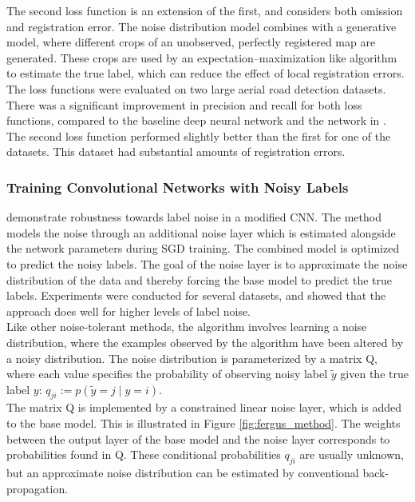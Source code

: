 The second loss function is an extension of the first, and considers both omission and registration error. The noise distribution model combines with a generative model, where different crops of an unobserved, perfectly registered map are generated. These crops are used by an expectation–maximization like algorithm to estimate the true label, which can reduce the effect of local registration errors.\\


The loss functions were evaluated on two large aerial road detection datasets. There was a significant improvement in precision and recall for both loss functions, compared to the baseline deep neural network and the network in \citep{Mnih_roads_high_res_aerial_images}. The second loss function performed slightly better than the first for one of the datasets. This dataset had substantial amounts of registration errors.\\


\subsubsection{Training Convolutional Networks with Noisy Labels}
\cite{Sukhbaatar_noisy_network_learning} demonstrate robustness towards label noise in a modified \ac{CNN}. The method models the noise through an additional noise layer which is estimated alongside the network parameters during \ac{SGD} training. The combined model is optimized to predict the noisy labels. The goal of the noise layer is to approximate the noise distribution of the data and thereby forcing the base model to predict the true labels. Experiments were conducted for several datasets, and showed that the approach does well for higher levels of label noise. \\

Like other noise-tolerant methods, the algorithm involves learning a noise distribution, where the examples observed by the algorithm have been altered by a noisy distribution. The noise distribution is parameterized by a matrix Q, where each value specifies the probability of observing noisy label $\tilde{y}$ given the true label $y$: $q_{ji} := p(\tilde{y} = j \mid y = i)$. \\

The matrix Q is implemented by a constrained linear noise layer, which is added to the base model. This is illustrated in Figure \ref{fig:fergus_method}. The weights between the output layer of the base model and the noise layer corresponds to probabilities found in Q. These conditional probabilities $q_{ji}$ are usually unknown, but an approximate noise distribution can be estimated by conventional back-propagation. \\


